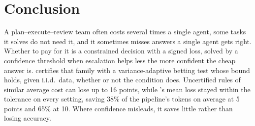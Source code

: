 \section{Conclusion}

A plan--execute--review team often costs several times a single agent, some tasks it solves do not
need it, and it sometimes misses answers a single agent gets right. Whether to pay for it is a constrained decision with a signed loss, solved by a confidence threshold when escalation helps less the
more confident the cheap answer is. \climb{} certifies that family with a variance-adaptive betting test whose bound holds, given i.i.d.\ data, whether or not the condition does. Uncertified rules of similar average cost can lose up to 16 points, while \climb{}'s mean loss stayed within the tolerance on every setting, saving 38\% of the pipeline's tokens on average at 5 points and 65\% at 10. Where confidence misleads, it saves little rather than losing accuracy.
